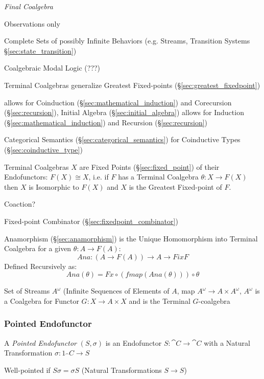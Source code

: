 \emph{Final Coalgebra}

Observations only

Complete Sets of possibly Infinite Behaviors (e.g. Streams, Transition
Systems \S\ref{sec:state_transition})

Coalgebraic Modal Logic (???)

Terminal Coalgebras generalize Greatest Fixed-points
(\S\ref{sec:greatest_fixedpoint}) \cite{rutten00}

allows for Coinduction (\S\ref{sec:mathematical_induction}) and
Corecursion (\S\ref{sec:recursion}), Initial Algebra
(\S\ref{sec:initial_algebra}) allows for Induction
(\S\ref{sec:mathematical_induction}) and Recursion
(\S\ref{sec:recursion})

Categorical Semantics (\S\ref{sec:categorical_semantics}) for
Coinductive Types (\S\ref{sec:coinductive_type})

Terminal Coalgebras $X$ are Fixed Points (\S\ref{sec:fixed_point}) of
their Endofunctors: $F(X) \cong X$, i.e. if $F$ has a Terminal
Coalgebra $\theta : X \rightarrow F(X)$ then $X$ is Isomorphic to
$F(X)$ and $X$ is the Greatest Fixed-point of $F$.

Coaction?

Fixed-point Combinator (\S\ref{sec:fixedpoint_combinator})

Anamorphism (\S\ref{sec:anamorphism}) is the Unique Homomorphism into
Terminal Coalgebra for a given $\theta : A \rightarrow F(A)$:
\[
  Ana : (A \rightarrow F (A)) \rightarrow A \rightarrow Fix F
\]
Defined Recursively as:
\[
  Ana (\theta) = Fx \circ (fmap (Ana (\theta))) \circ \theta
\]

Set of Streams $A^\omega$ (Infinite Sequences of Elements of $A$, map
$A^\omega \rightarrow A \times A^\omega$, $A^\omega$ is a Coalgebra
for Functor $G : X \rightarrow A \times X$ and is the Terminal
$G$-coalgebra



\subsubsection{Pointed Endofunctor}\label{sec:pointed_endofunctor}

A \emph{Pointed Endofunctor} $(S,\sigma)$ is an Endofunctor $S :
\cat{C} \rightarrow \cat{C}$ with a Natural Transformation $\sigma :
1_\cat{C} \rightarrow S$

Well-pointed if $S \sigma = \sigma S$ (Natural Transformations $S
\rightarrow S$)

